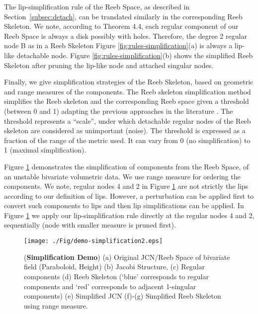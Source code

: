 \documentclass[twocolumn]{article}
\newcommand{\figref}[1]{Figure \ref{fig:#1}}
\begin{document}
The lip-simplification rule of the Reeb Space, as described in
Section~\ref{subsec:detach}, can be translated similarly in the
corresponding Reeb Skeleton. We note, according to Theorem 4.4,
 each regular component of our Reeb Space
 is always a disk possibly with holes. Therefore, the degree 2 regular
 node B as in a Reeb Skeleton \figref{rules-simplification}(a) is always a
 lip-like detachable node. \figref{rules-simplification}(b) shows the simplified Reeb
 Skeleton after pruning the lip-like node and attached singular nodes.

Finally, we give simplification strategies of the
Reeb Skeleton, based on geometric and range measures of the
components. The Reeb skeleton simplification method simplifies the Reeb skeleton
and the corresponding Reeb space given a threshold (between 0 and 1) adapting the previous approaches
in the literature \cite{2004-Carr-simplification, 2012-Tierny-tvcg}. The threshold represents a
``scale'', under which detachable regular nodes of the Reeb skeleton
are considered as unimportant (noise).
The threshold is expressed as a fraction of the range of the metric used. It can vary from 0 (no simplification) to 1
(maximal simplification). 


\figref{demo-simplification} demonstrates the simplification
of components from the  Reeb Space, of  an unstable bivariate
volumetric data. We use range measure for ordering the components.
We note, regular nodes 4  and 2 in \figref{demo-simplification} are not strictly the lips according to our
definition of lips. However, a perturbation can be applied first 
to convert such components to lips and then lip
simplifications can be applied. In \figref{demo-simplification} we apply our lip-simplification rule  
directly at the regular nodes 4  and 2, sequentially (node with
smaller measure is pruned first).

\begin{figure}[t]
\begin{center}
\texttt{[image: ./Fig/demo-simplification2.eps]}
\caption{(\textbf{Simplification Demo}) (a) Original  JCN/Reeb Space of bivariate field (Paraboloid, Height) 
  (b) Jacobi Structure, (c) Regular components (d) Reeb Skeleton (`blue'
  corresponds to regular components and `red'
  corresponds to adjacent 1-singular components)  (e)
  Simplified JCN
  (f)-(g) Simplified Reeb Skeleton using range measure.}
\label{fig:demo-simplification}
\end{center}
\end{figure}
\end{document}

